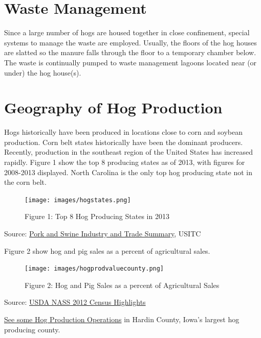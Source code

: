 \documentclass[
]{book}
\begin{document}
\hypertarget{waste-management}{%
\section{Waste Management}\label{waste-management}}

Since a large number of hogs are housed together in close confinement, special systems to manage the waste are employed. Usually, the floors of the hog houses are slatted so the manure falls through the floor to a temporary chamber below. The waste is continually pumped to waste management lagoons located near (or under) the hog house(s).

\hypertarget{geography-of-hog-production}{%
\section{Geography of Hog Production}\label{geography-of-hog-production}}

Hogs historically have been produced in locations close to corn and soybean production. Corn belt states historically have been the dominant producers. Recently, production in the southeast region of the United States has increased rapidly. Figure 1 show the top 8 producing states as of 2013, with figures for 2008-2013 displayed. North Carolina is the only top hog producing state not in the corn belt.

\begin{figure}
\centering
\texttt{[image: images/hogstates.png]}
\caption{Figure 1: Top 8 Hog Producing States in 2013}
\end{figure}

Source: \href{pdf-Readings/pork_and_swine_summary.pdf}{Pork and Swine Industry and Trade Summary}, USITC

Figure 2 show hog and pig sales as a percent of agricultural sales.

\begin{figure}
\centering
\texttt{[image: images/hogprodvaluecounty.png]}
\caption{Figure 2: Hog and Pig Sales as a percent of Agricultural Sales}
\end{figure}

Source: \href{pdf-Readings/12CensusHighlightsHogs.pdf}{USDA NASS 2012 Census Highlights}

\href{https://www.google.com/maps/place/Hardin+County,+IA/@42.3833668,-93.3907209,60627m/data=!3m2!1e3!4b1!4m2!3m1!1s0x87ee2ed39f2db5df:0x67a785cf003d5369!6m1!1e1}{See some Hog Production Operations} in Hardin County, Iowa's largest hog producing county.
\end{document}
